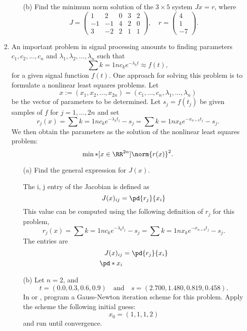 \documentclass[11pt, oneside]{article}
\begin{document}
\begin{enumerate}
\begin{enumerate}
      \item[(b)]
        Find the minimum norm solution of the $3 \times 5$ system $Jx = r$,
        where
        \[
          J =
          \begin{pmatrix}
            1 & 2 & 0 & 3 & 2 \\
            -1 & -1 & 4 & 2 & 0 \\
            3 & -2 & 2 & 1 & 1
          \end{pmatrix},
          \quad
          r =
          \begin{pmatrix}
            4 \\
            1 \\
            -7
          \end{pmatrix}.
        \]
    \end{enumerate}

  \item %
    An important problem in signal processing amounts to finding parameters
    $c_1, c_2, \ldots, c_n$ and $\lambda_1, \lambda_2, \ldots, \lambda_n$ such
    that
    \[
      \sum{k=1}{n}{c_k e^{-\lambda_k t}} \approx f(t),
    \]
    for a given signal function $f(t)$.
    One approach for solving this problem is to formulate a nonlinear least
    squares problems.
    Let
    \[
      x := (x_1, x_2, \ldots, x_{2n}) = (c_1, \ldots, c_n, \lambda_1, \ldots, \lambda_n)
    \]
    be the vector of parameters to be determined.
    Let $s_j = f(t_j)$ be given samples of $f$ for $j = 1,\ldots,2n$ and set
    \[
      r_j(x) = \sum{k=1}{n}{c_k e^{-\lambda_k t_j}} - s_j = \sum{k=1}{n}{x_k e^{-x_{n+k}t_j}} - s_j.
    \]
    We then obtain the parameters as the solution of the nonlinear least squares
    problem:
    \[
      \min*[x \in \RR^{2n}]{\norm{r(x)}^2}.
    \]
    \begin{enumerate}
      \item[(a)]
        Find the general expression for $J(x)$.

        The i, j entry of the Jacobian is defined as
        \[
          J(x)_{ij} = \pd{r_j}{x_i}
        \]
        This value can be computed using the following definition of $r_j$ for
        this problem,
        \[
          r_j(x) = \sum{k=1}{n}{c_k e^{-\lambda_k t_j}} - s_j = \sum{k=1}{n}{x_k e^{-x_{n+k}t_j}} - s_j.
        \]
        The entries are
        \begin{align*}
          J(x)_{ij} &= \pd{r_j}{x_i} \\
          \pd*{}{x_i}
        \end{align*}
      \item[(b)]
        Let $n = 2$, and
        \[
          t = (0.0, 0.3, 0.6, 0.9) \quad \text{and} \quad s = (2.700, 1.480, 0.819, 0.458).
        \]
        In \MATLAB or \PYTHON, program a Gauss-Newton iteration scheme for this
        problem.
        Apply the scheme the following initial guess:
        \[
          x_0 = (1, 1, 1, 2)
        \]
        and run until convergence.
    \end{enumerate}


\end{enumerate}
\end{document}
